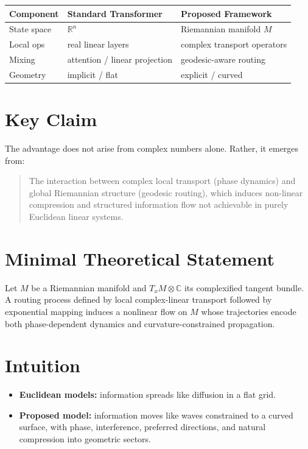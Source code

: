 \documentclass[11pt]{article}
\begin{document}
\begin{center}
\begin{tabular}{lll}
\toprule
\textbf{Component} & \textbf{Standard Transformer} & \textbf{Proposed Framework} \\
\midrule
State space  & $\mathbb{R}^n$                   & Riemannian manifold $M$       \\
Local ops    & real linear layers               & complex transport operators   \\
Mixing       & attention / linear projection    & geodesic-aware routing        \\
Geometry     & implicit / flat                  & explicit / curved             \\
\bottomrule
\end{tabular}
\end{center}

\section{Key Claim}

The advantage does not arise from complex numbers alone.
Rather, it emerges from:

\begin{quote}
The interaction between complex local transport (phase dynamics) and global Riemannian
structure (geodesic routing), which induces non-linear compression and structured information
flow not achievable in purely Euclidean linear systems.
\end{quote}

\section{Minimal Theoretical Statement}

Let $M$ be a Riemannian manifold and $T_xM \otimes \mathbb{C}$ its complexified tangent
bundle. A routing process defined by local complex-linear transport followed by exponential
mapping induces a nonlinear flow on $M$ whose trajectories encode both phase-dependent
dynamics and curvature-constrained propagation.

\section{Intuition}

\begin{itemize}
    \item \textbf{Euclidean models:} information spreads like diffusion in a flat grid.
    \item \textbf{Proposed model:} information moves like waves constrained to a curved
          surface, with phase, interference, preferred directions, and natural compression
          into geometric sectors.
\end{itemize}
\end{document}
